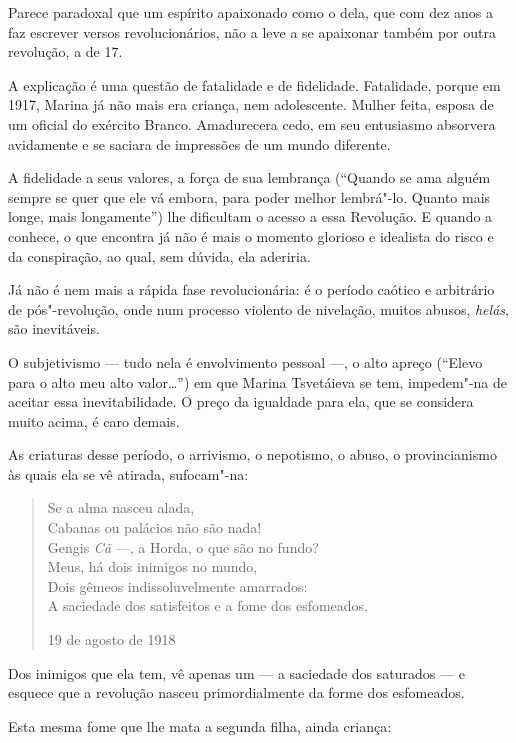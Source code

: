 {Parece paradoxal que um espírito apaixonado como o dela, que com dez
anos a faz escrever versos revolucionários, não a leve a se apaixonar
também por outra revolução, a de 17.

A explicação é uma questão de fatalidade e de fidelidade. Fatalidade,
porque em 1917, Marina já não mais era criança, nem adolescente. Mulher
feita, esposa de um oficial do exército Branco. Amadurecera cedo, em seu
entusiasmo absorvera avidamente e se saciara de impressões de um mundo
diferente.

A fidelidade a seus valores, a força de sua lembrança (``Quando se ama
alguém sempre se quer que ele vá embora, para poder melhor lembrá"-lo.
Quanto mais longe, mais longamente'') lhe dificultam o acesso a essa
Revolução. E quando a conhece, o que encontra já não é mais o momento
glorioso e idealista do risco e da conspiração, ao qual, sem dúvida, ela
aderiria.

Já não é nem mais a rápida fase revolucionária: é o período caótico e
arbitrário de pós"-revolução, onde num processo violento de nivelação,
muitos abusos, \emph{helás}, são inevitáveis.

O subjetivismo --- tudo nela é envolvimento pessoal ---, o alto apreço
(``Elevo para o alto meu alto valor\ldots{}'') em que Marina Tsvetáieva se
tem, impedem"-na de aceitar essa inevitabilidade. O preço da igualdade
para ela, que se considera muito acima, é caro demais.

As criaturas desse período, o arrivismo, o nepotismo, o abuso, o
provincianismo às quais ela se vê atirada, sufocam"-na:

\begin{verse}
Se a alma nasceu alada, \\
Cabanas ou palácios não são nada! \\
Gengis \emph{Cã} ---, a Horda, o que são no fundo? \\[8pt]
Meus, há dois inimigos no mundo, \\
Dois gêmeos indissoluvelmente amarrados: \\
A saciedade dos satisfeitos e a fome \qb{}dos esfomeados. 

19 de agosto de 1918

\end{verse}

Dos inimigos que ela tem, vê apenas um --- a saciedade dos saturados --- e
esquece que a revolução nasceu primordialmente da forme dos esfomeados.

Esta mesma fome que lhe mata a segunda filha, ainda criança:

}
